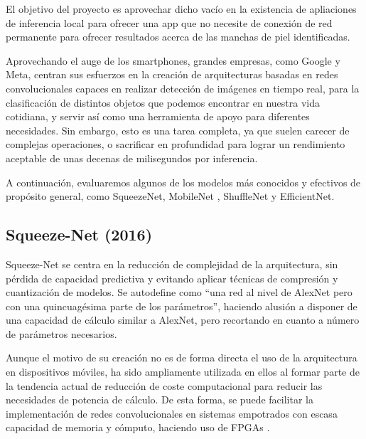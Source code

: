 El objetivo del proyecto es aprovechar dicho vacío en la existencia de apliaciones de inferencia local para ofrecer una app que no necesite de conexión de red permanente para ofrecer resultados acerca de las manchas de piel identificadas.

Aprovechando el auge de los smartphones, grandes empresas, como Google y Meta, centran sus esfuerzos en la creación de arquitecturas basadas en redes convolucionales capaces en realizar detección de imágenes en tiempo real, para la clasificación de distintos objetos que podemos encontrar en nuestra vida cotidiana, y servir así como una herramienta de apoyo para diferentes necesidades. Sin embargo, esto es una tarea completa, ya que suelen carecer de complejas operaciones, o sacrificar en profundidad para lograr un rendimiento aceptable de unas decenas de milisegundos por inferencia.

A continuación, evaluaremos algunos de los modelos más conocidos y efectivos de propósito general, como SqueezeNet\cite{iandola2016squeezenet}, MobileNet \cite{howard2017mobilenets,sandler2019mobilenetv2,howard2019searching}, ShuffleNet \cite{zhang2017shufflenet} y  EfficientNet\cite{tan2020efficientnet,eflite}.

\subsection{Squeeze-Net (2016)}

Squeeze-Net\cite{iandola2016squeezenet} se centra en la reducción de complejidad de la arquitectura, sin pérdida de capacidad predictiva y evitando aplicar técnicas de compresión y cuantización\cite{kuzmin2024fp8} de modelos. Se autodefine como ``una red al nivel de AlexNet\cite{NIPS2012_c399862d} pero con una quincuagésima parte de los parámetros'', haciendo alusión a disponer de una capacidad de cálculo similar a AlexNet, pero recortando en cuanto a número de parámetros necesarios.

Aunque el motivo de su creación no es de forma directa el uso de la arquitectura en dispositivos móviles, ha sido ampliamente utilizada en ellos al formar parte de la tendencia actual de reducción de coste computacional para reducir las necesidades de potencia de cálculo. De esta forma, se puede facilitar la implementación de redes convolucionales en sistemas empotrados con escasa capacidad de memoria y cómputo, haciendo uso de FPGAs \cite{fpga}.

